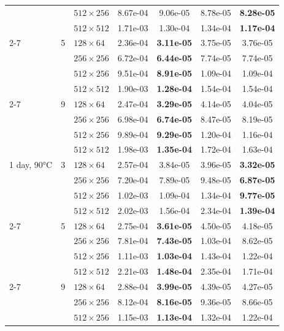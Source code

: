 \begin{table}[htb]
\begin{tabular}{l l l  c c c c}
     &  & $512\times256$ & 8.67e-04 & 9.06e-05 & 8.78e-05 & \textbf{8.28e-05} \\
     &  & $512\times512$ & 1.71e-03 & 1.30e-04 & 1.34e-04 & \textbf{1.17e-04} \\
    \cmidrule(lr){2-7}
     & 5 & $128\times64$ & 2.36e-04 & \textbf{3.11e-05} & 3.75e-05 & 3.76e-05 \\
     &  & $256\times256$ & 6.72e-04 & \textbf{6.44e-05} & 7.74e-05 & 7.74e-05 \\
     &  & $512\times256$ & 9.51e-04 & \textbf{8.91e-05} & 1.09e-04 & 1.09e-04 \\
     &  & $512\times512$ & 1.90e-03 & \textbf{1.28e-04} & 1.54e-04 & 1.54e-04 \\
    \cmidrule(lr){2-7}
     & 9 & $128\times64$ & 2.47e-04 & \textbf{3.29e-05} & 4.14e-05 & 4.04e-05 \\
     &  & $256\times256$ & 6.98e-04 & \textbf{6.74e-05} & 8.47e-05 & 8.19e-05 \\
     &  & $512\times256$ & 9.89e-04 & \textbf{9.29e-05} & 1.20e-04 & 1.16e-04 \\
     &  & $512\times512$ & 1.98e-03 & \textbf{1.35e-04} & 1.72e-04 & 1.63e-04 \\
    \midrule
    1 day, 90°C & 3 & $128\times64$ & 2.57e-04 & 3.84e-05 & 3.96e-05 & \textbf{3.32e-05} \\
     &  & $256\times256$ & 7.20e-04 & 7.89e-05 & 9.48e-05 & \textbf{6.87e-05} \\
     &  & $512\times256$ & 1.02e-03 & 1.09e-04 & 1.34e-04 & \textbf{9.77e-05} \\
     &  & $512\times512$ & 2.02e-03 & 1.56e-04 & 2.34e-04 & \textbf{1.39e-04} \\
    \cmidrule(lr){2-7}
     & 5 & $128\times64$ & 2.75e-04 & \textbf{3.61e-05} & 4.50e-05 & 4.18e-05 \\
     &  & $256\times256$ & 7.81e-04 & \textbf{7.43e-05} & 1.03e-04 & 8.62e-05 \\
     &  & $512\times256$ & 1.11e-03 & \textbf{1.03e-04} & 1.43e-04 & 1.22e-04 \\
     &  & $512\times512$ & 2.21e-03 & \textbf{1.48e-04} & 2.35e-04 & 1.71e-04 \\
    \cmidrule(lr){2-7}
     & 9 & $128\times64$ & 2.88e-04 & \textbf{3.99e-05} & 4.39e-05 & 4.27e-05 \\
     &  & $256\times256$ & 8.12e-04 & \textbf{8.16e-05} & 9.36e-05 & 8.66e-05 \\
     &  & $512\times256$ & 1.15e-03 & \textbf{1.13e-04} & 1.32e-04 & 1.22e-04 \\

\end{tabular}
\end{table}
